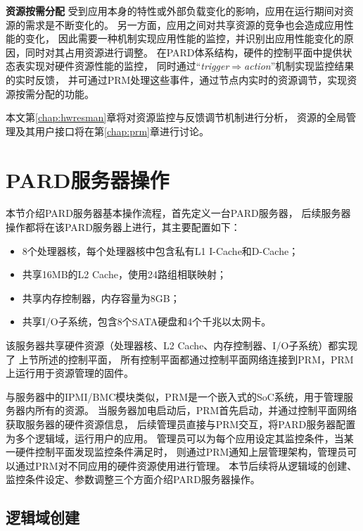 \textbf{资源按需分配}\quad
受到应用本身的特性或外部负载变化的影响，应用在运行期间对资源的需求是不断变化的。
另一方面，应用之间对共享资源的竞争也会造成应用性能的变化，
因此需要一种机制实现应用性能的监控，并识别出应用性能变化的原因，同时对其占用资源进行调整。
在PARD体系结构，硬件的控制平面中提供状态表实现对硬件资源性能的监控，
同时通过``\emph{trigger$\Rightarrow$action}''机制实现监控结果的实时反馈，
并可通过PRM处理这些事件，通过节点内实时的资源调节，实现资源按需分配的功能。

本文第\ref{chap:hwresman}章将对资源监控与反馈调节机制进行分析，
资源的全局管理及其用户接口将在第\ref{chap:prm}章进行讨论。


\iffalse

\section{PARD服务器操作}

本节介绍PARD服务器基本操作流程，首先定义一台PARD服务器，
后续服务器操作都将在该PARD服务器上进行，其主要配置如下：

\begin{itemize}
  \item 8个处理器核，每个处理器核中包含私有L1 I-Cache和D-Cache；
  \item 共享16MB的L2 Cache，使用24路组相联映射；
  \item 共享内存控制器，内存容量为8GB；
  \item 共享I/O子系统，包含8个SATA硬盘和4个千兆以太网卡。
\end{itemize}

该服务器共享硬件资源（处理器核、L2 Cache、内存控制器、I/O子系统）都实现了
上节所述的控制平面，%
所有控制平面都通过控制平面网络连接到PRM，PRM上运行用于资源管理的固件。

与服务器中的IPMI/BMC模块\cite{ipmi}类似，PRM是一个嵌入式的SoC系统，用于管理服务器内所有的资源。
当服务器加电启动后，PRM首先启动，并通过控制平面网络获取服务器的硬件资源信息，
后续管理员直接与PRM交互，将PARD服务器配置为多个逻辑域，运行用户的应用。
管理员可以为每个应用设定其监控条件，当某一硬件控制平面发现监控条件满足时，
则通过PRM通知上层管理架构，管理员可以通过PRM对不同应用的硬件资源使用进行管理。
本节后续将从逻辑域的创建、监控条件设定、参数调整三个方面介绍PARD服务器操作。

\subsection{逻辑域创建}


